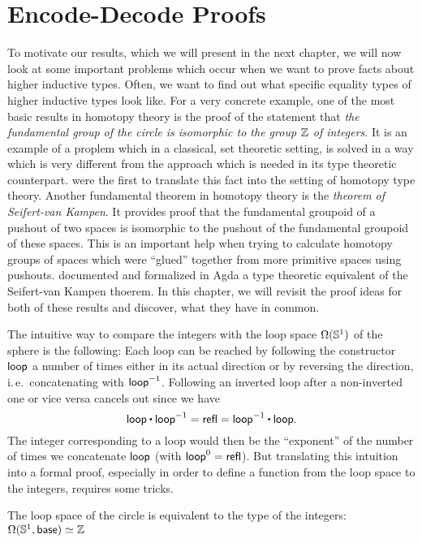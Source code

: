 \section{Encode-Decode Proofs}\label{sec:hit-encode-decode}

To motivate our results, which we will present in the next chapter,
we will now look at some important problems which occur when
we want to prove facts about higher inductive types.
Often, we want to find out what specific equality types of
higher inductive types look like.
For a very concrete example, one of the most basic results in homotopy theory
is the proof of the statement that \emph{the fundamental group of the circle is
isomorphic to the group $\mathbb Z$ of integers}.
It is an example of a proplem which in a classical, set theoretic setting,
is solved in a way which is very different from the approach which is needed
in its type theoretic counterpart.
\cite{licataShulman_circle} were the first to translate this fact into the
setting of homotopy type theory.
Another fundamental theorem in homotopy theory is the \emph{theorem of
Seifert-van Kampen}.
It provides proof that the fundamental groupoid of a pushout of two spaces is
isomorphic to the pushout of the fundamental groupoid of these spaces.
This is an important help when trying to calculate homotopy groups of spaces
which were ``glued'' together from more primitive spaces using pushouts.
\cite{favonia:SvK} documented and formalized in Agda a type theoretic
equivalent of the Seifert-van Kampen thoerem.
In this chapter, we will revisit the proof ideas for both of these results
and discover, what they have in common.

The intuitive way to compare the integers with the loop space
$\Omega(\mathbb{S}^1)$ of the sphere is the following:
Each loop can be reached by following the constructor $\mathsf{loop}$ a number of
times either in its actual direction or by reversing the direction, i.\,e.\
concatenating with $\mathsf{loop} ^{-1}$.
Following an inverted loop after a non-inverted one or vice versa cancels out since
we have
\begin{equation*}
\Sloop \ct \Sloop \inv = \refl = \Sloop \inv \ct \Sloop \text{.}
\end{equation*}
The integer corresponding to a loop would then be the ``exponent'' of the number
of times we concatenate $\mathsf{loop}$ (with $\mathsf{loop}^0 = \mathsf{refl}$).
But translating this intuition into a formal proof, especially in order
to define a function from the loop space to the integers, requires some tricks.
\begin{thm}[Loop Space of the Circle, \cite{licataShulman_circle}]\label{thm:hit-s1}
The loop space of the circle is equivalent to the
type of the integers: $\Omega(\mathbb{S}^1, \mathsf{base}) \simeq \mathbb Z$
\end{thm}

